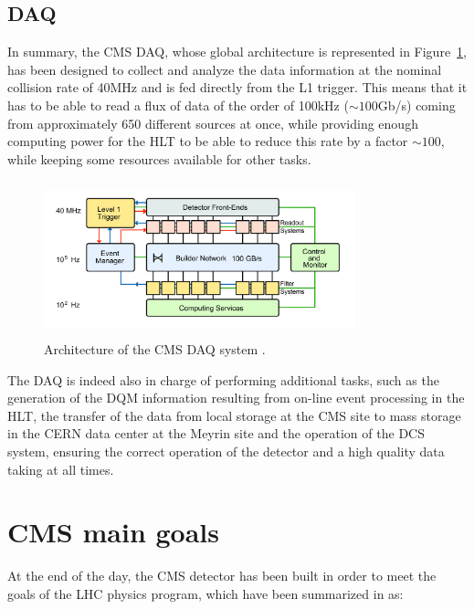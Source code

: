 \documentclass[a4paper, 10pt, openright]{report}
\begin{document}
\subsection{\acf{DAQ}} \label{subsection:DAQ}

In summary, the CMS \ac{DAQ}, whose global architecture is represented in Figure~\ref{fig:CMSDAQ}, has been designed to collect and analyze the data information at the nominal collision rate of 40MHz and is fed directly from the \ac{L1} trigger. This means that it has to be able to read a flux of data of the order of 100kHz ($\sim 100$Gb/s) coming from approximately 650 different sources at once, while providing enough computing power for the \ac{HLT} to be able to reduce this rate by a factor $\sim 100$, while keeping some resources available for other tasks.

\begin{figure}[htbp]
\begin{center}
\includegraphics[width=9cm, height=4.5cm]{figs/CMSDAQ.png}
\caption{Architecture of the \ac{CMS} \ac{DAQ} system \cite{CMSDescription}.}
\label{fig:CMSDAQ}
\end{center}
\end{figure}

The \ac{DAQ} is indeed also in charge of performing additional tasks, such as the generation of the \ac{DQM} information resulting
from on-line event processing in the \ac{HLT}, the transfer of the data from local storage at the \ac{CMS} site to mass storage in the \ac{CERN} data center at the Meyrin site and the operation of the \ac{DCS} system, ensuring the correct operation of the detector and a high quality data taking at all times. %

\section{\acs{CMS} main goals}

At the end of the day, the \ac{CMS} detector has been built in order to meet the goals of the \ac{LHC} physics program, which have been summarized in \cite{CMSDescription} as:
\end{document}
